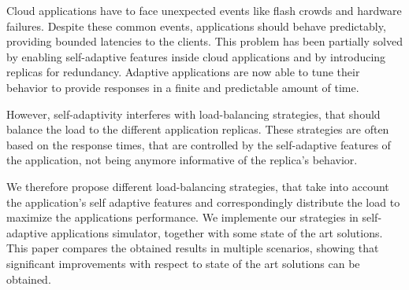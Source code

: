 Cloud applications have to face unexpected events like flash crowds
and hardware failures. Despite these common events, applications
should behave predictably, providing bounded latencies to the
clients. This problem has been partially solved by enabling
self-adaptive features inside cloud applications and by introducing
replicas for redundancy. Adaptive applications are now able to tune
their behavior to provide responses in a finite and predictable amount
of time.

However, self-adaptivity interferes with load-balancing strategies,
that should balance the load to the different application
replicas. These strategies are often based on the response times, that
are controlled by the self-adaptive features of the application, not
being anymore informative of the replica's behavior.

We therefore propose different load-balancing strategies, that take
into account the application's self adaptive features and
correspondingly distribute the load to maximize the applications
performance. We implemente our strategies in self-adaptive
applications simulator, together with some state of the art
solutions. This paper compares the obtained results in multiple
scenarios, showing that significant improvements with respect to state
of the art solutions can be obtained.
